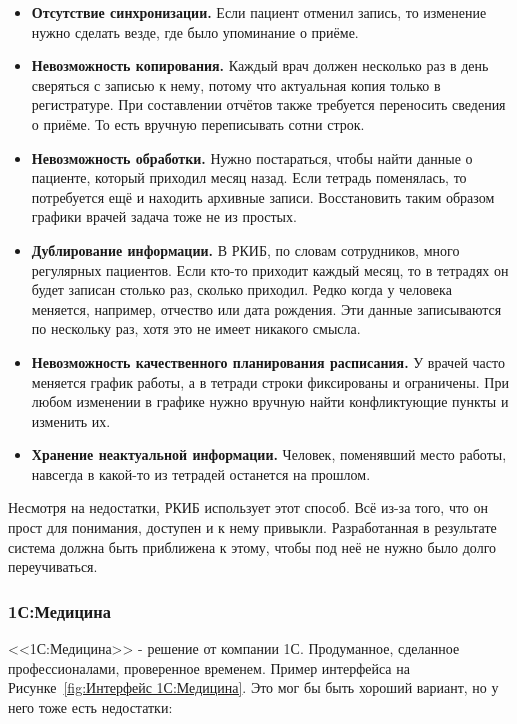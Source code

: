 \documentclass[a4paper,article]{article}
\begin{document}
        \begin{itemize}[nolistsep]
            \item \textbf{Отсутствие синхронизации.} Если пациент отменил запись, то изменение нужно сделать везде, где было упоминание о приёме.
            \item \textbf{Невозможность копирования.} Каждый врач должен несколько раз в день сверяться с записью к нему, потому что актуальная копия только в регистратуре. При составлении отчётов также требуется переносить сведения о приёме. То есть вручную переписывать сотни строк.
            \item \textbf{Невозможность обработки.} Нужно постараться, чтобы найти данные о пациенте, который приходил месяц назад. Если тетрадь поменялась, то потребуется ещё и находить архивные записи. Восстановить таким образом графики врачей задача тоже не из простых.
            \item \textbf{Дублирование информации.} В РКИБ, по словам сотрудников, много регулярных пациентов. Если кто-то приходит каждый месяц, то в тетрадях он будет записан столько раз, сколько приходил. Редко когда у человека меняется, например, отчество или дата рождения. Эти данные записываются по нескольку раз, хотя это не имеет никакого смысла.
            \item \textbf{Невозможность качественного планирования расписания.} У врачей часто меняется график работы, а в тетради строки фиксированы и ограничены. При любом изменении в графике нужно вручную найти конфликтующие пункты и изменить их.
            \item \textbf{Хранение неактуальной информации.} Человек, поменявший место работы, навсегда в какой-то из тетрадей останется на прошлом.
        \end{itemize}

        Несмотря на недостатки, РКИБ использует этот способ. Всё из-за того, что он прост для понимания, доступен и к нему привыкли. Разработанная в результате система должна быть приближена к этому, чтобы под неё не нужно было долго переучиваться.

    \subsubsection{1С:Медицина}

        <<1С:Медицина>> - решение от компании 1С. Продуманное, сделанное профессионалами, проверенное временем. Пример интерфейса на Рисунке~\ref{fig:Интерфейс 1С:Медицина}. Это мог бы быть хороший вариант, но у него тоже есть недостатки:
\end{document}
